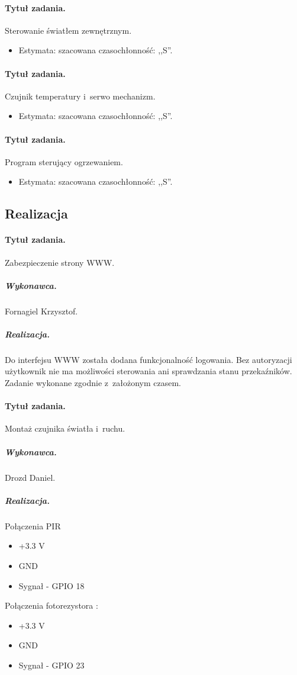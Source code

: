 \paragraph{Tytuł zadania.} Sterowanie światłem zewnętrznym.
\begin{itemize}
	\item Estymata: szacowana czasochłonność: ,,S''.
\end{itemize}

\paragraph{Tytuł zadania.} Czujnik temperatury i~serwo mechanizm.
\begin{itemize}
	\item Estymata: szacowana czasochłonność: ,,S''.
\end{itemize}

\paragraph{Tytuł zadania.} Program sterujący ogrzewaniem.
\begin{itemize}
	\item Estymata: szacowana czasochłonność: ,,S''.
\end{itemize}


\subsection{Realizacja}

\paragraph{Tytuł zadania.} Zabezpieczenie strony WWW.
\subparagraph{Wykonawca.} Fornagiel Krzysztof.
\subparagraph{Realizacja.} Do interfejsu WWW została dodana funkcjonalność logowania. Bez autoryzacji użytkownik nie ma możliwości sterowania ani sprawdzania stanu przekaźników. Zadanie wykonane zgodnie z~założonym czasem.

\paragraph{Tytuł zadania.} Montaż czujnika światła i~ruchu.
\subparagraph{Wykonawca.} Drozd Daniel.
\subparagraph{Realizacja.} 	Połączenia PIR 

\begin{itemize}
	\item +3.3 V
	\item GND
	\item Sygnał - GPIO 18
\end{itemize}
Połączenia fotorezystora :
\begin{itemize}
	\item +3.3 V
	\item GND
	\item Sygnał - GPIO 23
\end{itemize}

